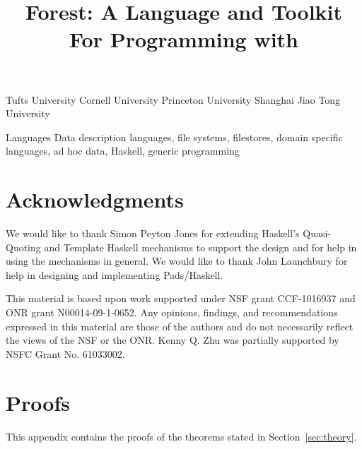 \documentclass[natbib]{sigplanconf}
\newif\ifappendix\appendixtrue   %
\newif\ifanon\anonfalse          %
\begin{document}


\copyrightdata{} 

\title{Forest: A Language and Toolkit For Programming with \Filestores{}}

\ifanon
\authorinfo{\vskip -2in}
 	   {\vskip -2in}
           {}
\else
{}
	   {Tufts University}{}
           {Cornell University}{}
           {Princeton University}{}
           {Shanghai Jiao Tong University}{}
\fi

\maketitle{}

\begin{abstract}  

\end{abstract}

\terms
Languages
\keywords
Data description languages, file systems, filestores,
domain specific languages, ad hoc data, Haskell,
generic programming











\section*{Acknowledgments}
We would like to thank Simon Peyton Jones for extending Haskell's
Quasi-Quoting and Template Haskell mechanisms to support the \forest{}
design and for help in using the mechanisms in general.  We would like
to thank John Launchbury for help in designing and implementing
Pads/Haskell. 

This material is based upon work supported under NSF grant CCF-1016937
and ONR grant N00014-09-1-0652. Any opinions, findings, and
recommendations expressed in this material are those of the authors
and do not necessarily reflect the views of the NSF or the ONR.
Kenny Q. Zhu was partially supported by NSFC Grant No. 61033002.


\balance


\ifappendix
\onecolumn
\newpage
\appendix

\closeproofchan
\section{Proofs}

\noindent This appendix contains the proofs of the theorems stated in
Section~\ref{sec:theory}.

\label{sec:proof-appendix}

\newpage

\fi
\end{document}
